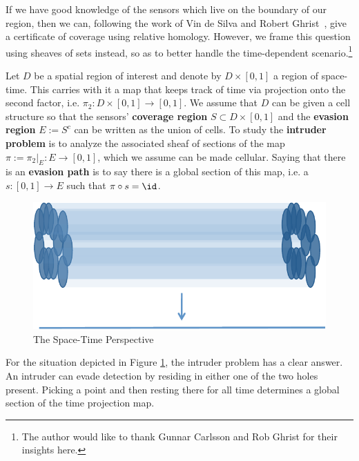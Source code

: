 If we have good knowledge of the sensors which live on the boundary of our region, then we can, following the work of Vin de Silva and Robert Ghrist~\cite{VdSRG}, give a certificate of coverage using relative homology. However, we frame this question using sheaves of sets instead, so as to better handle the time-dependent scenario.\footnote{The author would like to thank Gunnar Carlsson and Rob Ghrist for their insights here.}

\begin{defn}
Let $D$ be a spatial region of interest and denote by $D\times[0,1]$ a region of space-time. This carries with it a map that keeps track of time via projection onto the second factor, i.e. $\pi_2:D\times [0,1]\to[0,1]$. We assume that $D$ can be given a cell structure so that the sensors' \textbf{coverage region} $S\subset D\times [0,1]$ and the \textbf{evasion region} $E:=S^c$ can be written as the union of cells. To study the \textbf{intruder problem} is to analyze the associated sheaf of sections of the map $\pi:=\pi_2|_E :E\to [0,1]$, which we assume can be made cellular. Saying that there is an \textbf{evasion path} is to say there is a global section of this map, i.e. a $s:[0,1]\to E$ such that $\pi\circ s=\id$.
\end{defn}

\begin{figure}
\centering
\includegraphics[width=\textwidth]{coverage_section.pdf}
\caption{The Space-Time Perspective}
\label{fig:coverage_section}
\end{figure}

\begin{ex}
For the situation depicted in Figure \ref{fig:coverage_section}, the intruder problem has a clear answer. An intruder can evade detection by residing in either one of the two holes present. Picking a point and then resting there for all time determines a global section of the time projection map. 
\end{ex}

